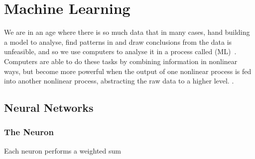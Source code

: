 
\chapter{Machine Learning}

We are in an age where there is so much data that in many cases, hand building a model to analyse, find patterns in and draw conclusions from the data is unfeasible, and so we use computers to analyse it in a process called  (ML)~\autocite[1]{murphy2012}.
Computers are able to do these tasks by combining information in nonlinear ways, but become more powerful when the output of one nonlinear process is fed into another nonlinear process, abstracting the raw data to a higher level.
.

\section{Neural Networks}

\subsection{The Neuron}

\begin{todo}
	Each neuron performs a weighted sum 
\end{todo}


